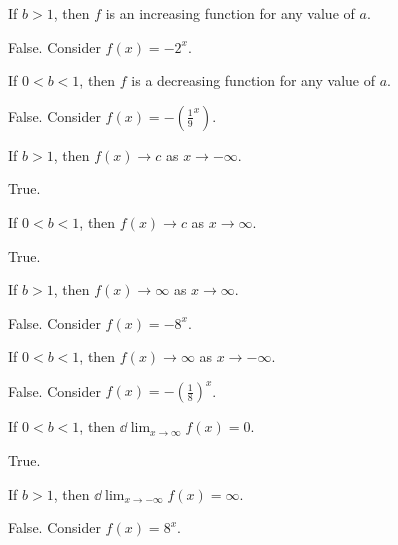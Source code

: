 \begin{exercises}
\begin{problem}
\begin{subproblem}
	If $b>1$, then $f$ is an increasing function for any value of $a$.
	\begin{shortsolution}
		False. Consider $f(x)=-2^x$.
	\end{shortsolution}
\end{subproblem}
\begin{subproblem}
	If $0<b<1$, then $f$ is a decreasing function for any value of $a$.
	\begin{shortsolution}
		False. Consider $f(x)=-\left(\frac{1}{9}^{x}\right)$.
	\end{shortsolution}
\end{subproblem}
\begin{subproblem}
	If $b>1$, then $f(x)\to c$ as $x\to -\infty$.
	\begin{shortsolution}
		True.
	\end{shortsolution}
\end{subproblem}
\begin{subproblem}
	If $0<b<1$, then $f(x)\to c$ as $x\to\infty$.
	\begin{shortsolution}
		True.
	\end{shortsolution}
\end{subproblem}
\begin{subproblem}
	If $b>1$, then $f(x)\to \infty$ as $x\to \infty$.
	\begin{shortsolution}
		False. Consider $f(x)=-8^{x}$.
	\end{shortsolution}
\end{subproblem}
\begin{subproblem}
	If $0<b<1$, then $f(x)\to \infty$ as $x\to -\infty$.
	\begin{shortsolution}
		False. Consider $f(x)=-\left(\frac{1}{8}\right)^{x}$.
	\end{shortsolution}
\end{subproblem}
\begin{subproblem}
	If $0<b<1$, then $\dd\lim_{x\to\infty}f(x)=0$.
	\begin{shortsolution}
		True.
	\end{shortsolution}
\end{subproblem}
\begin{subproblem}
	If $b>1$, then $\dd\lim_{x\to-\infty}f(x)=\infty$.
	\begin{shortsolution}
		False. Consider $f(x)=8^{x}$.
	\end{shortsolution}
\end{subproblem}
\begin{subproblem}

\end{subproblem}
\end{problem}
\end{exercises}
